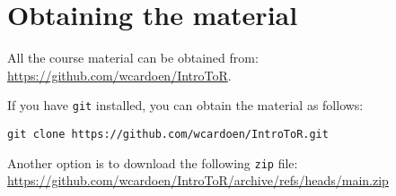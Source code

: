 \section{Obtaining the material}
All the course material can be obtained from: \href{https://github.com/wcardoen/IntroToR}{https://github.com/wcardoen/IntroToR}.

If you have \texttt{git} installed, you can obtain the material as follows:
\begin{verbatim}
git clone https://github.com/wcardoen/IntroToR.git
\end{verbatim}
Another option is to download the following \texttt{zip} file: \newline 
\href{https://github.com/wcardoen/IntroToR/archive/refs/heads/main.zip}{https://github.com/wcardoen/IntroToR/archive/refs/heads/main.zip}

